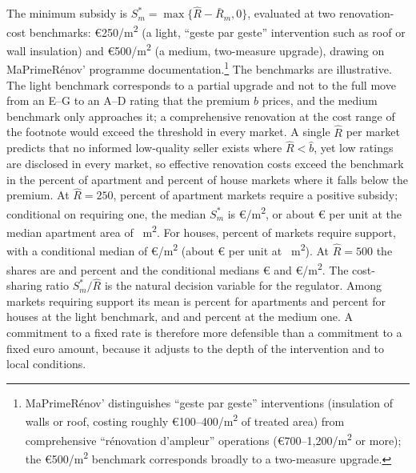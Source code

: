 The minimum subsidy is $S^*_m=\max\{\hat R-\bar R_m,0\}$, evaluated at two renovation-cost benchmarks: \euro{}250/m\textsuperscript{2} (a light, ``geste par geste'' intervention such as roof or wall insulation) and \euro{}500/m\textsuperscript{2} (a medium, two-measure upgrade), drawing on MaPrimeR\'enov' programme documentation.\footnote{MaPrimeR\'enov' distinguishes ``geste par geste'' interventions (insulation of walls or roof, costing roughly \euro{}100--400/m\textsuperscript{2} of treated area) from comprehensive ``r\'enovation d'ampleur'' operations (\euro{}700--1{,}200/m\textsuperscript{2} or more); the \euro{}500/m\textsuperscript{2} benchmark corresponds broadly to a two-measure upgrade.} The benchmarks are illustrative. The light benchmark corresponds to a partial upgrade and not to the full move from an E--G to an A--D rating that the premium $b$ prices, and the medium benchmark only approaches it; a comprehensive renovation at the cost range of the footnote would exceed the threshold in every market. A single $\hat R$ per market predicts that no informed low-quality seller exists where $\hat R<\hat b$, yet low ratings are disclosed in every market, so effective renovation costs exceed the benchmark in the \attBaseNoSubsidyTwoFiftyApt{} percent of apartment and \attBaseNoSubsidyTwoFiftyHouse{} percent of house markets where it falls below the premium. At $\hat R=250$, \attScBaseShareTwoFiftyApt{} percent of apartment markets require a positive subsidy; conditional on requiring one, the median $S^*_m$ is \euro{}\attBaseSMedTwoFiftyApt{}/m\textsuperscript{2}, or about \euro{}\attBaseUnitTwoFiftyApt{} per unit at the median apartment area of \attBaseAreaMedApt{}~m\textsuperscript{2}. For houses, \attScBaseShareTwoFiftyHouse{} percent of markets require support, with a conditional median of \euro{}\attBaseSMedTwoFiftyHouse{}/m\textsuperscript{2} (about \euro{}\attBaseUnitTwoFiftyHouse{} per unit at \attBaseAreaMedHouse{}~m\textsuperscript{2}). At $\hat R=500$ the shares are \attScBaseShareFiveHundredApt{} and \attScBaseShareFiveHundredHouse{} percent and the conditional medians \euro{}\attBaseSMedFiveHundredApt{} and \euro{}\attBaseSMedFiveHundredHouse{}/m\textsuperscript{2}. The cost-sharing ratio $S^*_m/\hat R$ is the natural decision variable for the regulator. Among markets requiring support its mean is \attBaseCostShareTwoFiftyApt{} percent for apartments and \attBaseCostShareTwoFiftyHouse{} percent for houses at the light benchmark, and \attBaseCostShareFiveHundredApt{} and \attBaseCostShareFiveHundredHouse{} percent at the medium one. A commitment to a fixed rate is therefore more defensible than a commitment to a fixed euro amount, because it adjusts to the depth of the intervention and to local conditions.

